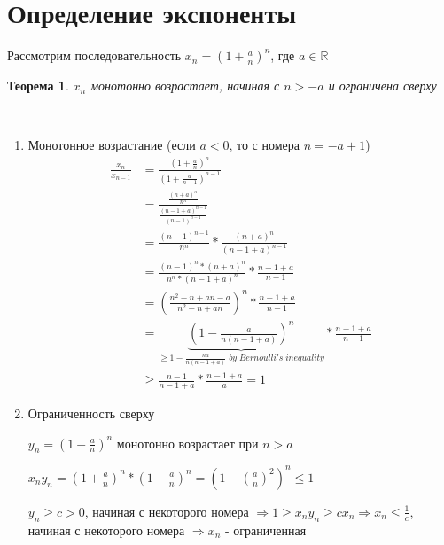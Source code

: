 \documentclass[12pt,letterpaper]{report}
\makeatletter
\newtheorem*{theorem-non}{Теорема}
\theoremstyle{definition}
\renewenvironment{proof}[1][\proofname]{%
   \par\pushQED{\qed}\normalfont%
   \topsep6\p@\@plus6\p@\relax
   \trivlist\item[\hskip\labelsep\bfseries#1\@addpunct{.}]%
   \ignorespaces
}{%
   \popQED\endtrivlist\@endpefalse
}
\makeatother
\begin{document}
    \section{Определение экспоненты}
    Рассмотрим последовательность $x_n = (1 + \frac{a}{n})^n$, где $a \in \mathbb{R}$
    \begin{theorem-non}
    $x_n$ монотонно возрастает, начиная с $n > -a$ и ограничена сверху
    \end{theorem-non}
    \begin{proof} \quad \\
        \begin{enumerate}
        \item Монотонное возрастание (если $a < 0$, то с номера $n = -a + 1$)
        \begin{equation*}
            \begin{split}
                \frac{x_n}{x_{n - 1}} &= \frac{(1 + \frac{a}{n})^n}{(1 + \frac{a}{n - 1})^{n - 1}} \\ 
                &= \frac{\frac{(n + a)^n}{n^n}}{\frac{(n - 1 + a)^{n - 1}}{(n - 1)^{n - 1}}} \\ 
                &= \frac{(n - 1)^{n - 1}}{n^n} * \frac{(n + a)^n}{(n - 1 + a)^{n - 1}} \\
                &= \frac{(n - 1)^n * (n + a)^n}{n^n * (n - 1 + a)^n } * \frac{n - 1 + a}{n - 1} \\
                &= (\frac{n^2 - n + an - a}{n^2 - n + an})^n * \frac{n - 1 + a}{n - 1} \\ 
                &= \underbrace{(1 - \frac{a}{n(n - 1 + a)})^n}_{\geqslant 1 - \frac{na}{n(n - 1 + a)} \;by\; Bernoulli's\; inequality} * \frac{n - 1 + a}{n - 1} \\
                &\geqslant\frac{n - 1}{n - 1 + a} * \frac{n - 1 + a}{a} = 1
            \end{split}
        \end{equation*}
        \item Ограниченность сверху
        
        $y_n = (1 - \frac{a}{n})^n$ монотонно возрастает при $n > a$ 
        
        $x_ny_n = (1 + \frac{a}{n})^n * (1 - \frac{a}{n})^n = (1 - (\frac{a}{n})^2)^n \leqslant 1$
        
        $y_n \geqslant c > 0$, начиная с некоторого номера $\Rightarrow 1 \geqslant x_ny_n \geqslant cx_n \Rightarrow x_n \leqslant \frac{1}{c}$, начиная с некоторого номера $\Rightarrow x_n$ - ограниченная
        \end{enumerate}
    \end{proof}
\end{document}
